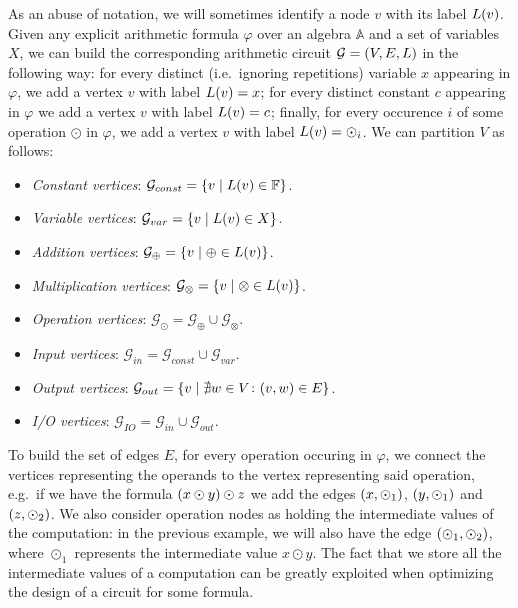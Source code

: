 As an abuse of notation, we will sometimes identify a node \(v\) with its label \(\call{L}{v}\).
Given any explicit arithmetic formula \(\varphi \) over an algebra \(\mathbb{A}\) and a set of 
variables \(X\), we can build the corresponding arithmetic circuit \(\mathcal{G} = \Tuple{V, E, L}\) 
in the following way: for every distinct (i.e.\ ignoring repetitions) variable \(x\) appearing 
in \(\varphi \), we add a vertex \(v\) with label \(\call{L}{v} = x\); 
for every distinct constant \(c\) appearing in \(\varphi \) we add a vertex \(v\) with label 
\(\call{L}{v} = c\); 
finally, for every occurence \(i\) of some operation \(\odot \) in \(\varphi \), we add a vertex
\(v\) with label \(\call{L}{v} = \odot_{i}\).
We can partition \(V\) as follows:
\begin{itemize}
  \item \emph{Constant vertices}: 
    \(\mathcal{G}_{const} = \Set{v \mid \call{L}{v} \in \mathbb{F}}\).
  \item \emph{Variable vertices}: 
    \(\mathcal{G}_{var} = \Set{v \mid \call{L}{v} \in X}\).
  \item \emph{Addition vertices}: 
    \(\mathcal{G}_{\oplus} = \Set{v \mid \oplus \in \call{L}{v}}\).
  \item \emph{Multiplication vertices}: 
    \(\mathcal{G}_{\otimes} = \Set{v \mid \otimes \in \call{L}{v}}\).
    \item \emph{Operation vertices}:
    \(\mathcal{G}_{\odot} = \mathcal{G}_{\oplus} \cup \mathcal{G}_{\otimes}\).
  \item \emph{Input vertices}: 
    \(\mathcal{G}_{in} = \mathcal{G}_{const} \cup \mathcal{G}_{var}\).
  \item \emph{Output vertices}: 
    \(\mathcal{G}_{out} = \Set{v \mid \nexists w \in V\colon \Tuple{v, w} \in E}\).
  \item \emph{I/O vertices}: \(\mathcal{G}_{IO} = \mathcal{G}_{in} \cup \mathcal{G}_{out}\).
\end{itemize}

To build the set of edges \(E\), for every operation occuring in \(\varphi \), we connect the 
vertices representing the operands to the vertex representing said operation, e.g.\ if we have 
the formula \(\Parens*{x \odot y} \odot z\) we add the edges \(\Tuple{x, \odot_1}\), 
\(\Tuple{y, \odot_1}\) and \(\Tuple{z, \odot_2}\).
We also consider operation nodes as holding the intermediate values of the computation: in the 
previous example, we will also have the edge \(\Tuple{\odot_1, \odot_2}\), where \(\odot_1 \) 
represents the intermediate value \(x \odot y\).
The fact that we store all the intermediate values of a computation can be greatly exploited when
optimizing the design of a circuit for some formula.

